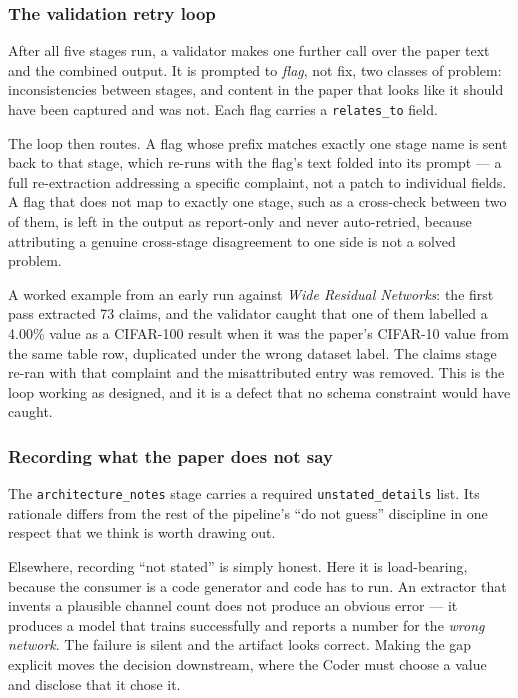 \documentclass[10pt,twocolumn]{article}
\begin{document}
\subsubsection{The validation retry loop}

After all five stages run, a validator makes one further call over the paper text and the
combined output. It is prompted to \emph{flag}, not fix, two classes of problem:
inconsistencies between stages, and content in the paper that looks like it should have
been captured and was not. Each flag carries a \texttt{relates\_to} field.

The loop then routes. A flag whose prefix matches exactly one stage name is sent back to
that stage, which re-runs with the flag's text folded into its prompt --- a full
re-extraction addressing a specific complaint, not a patch to individual fields. A flag
that does not map to exactly one stage, such as a cross-check between two of them, is
left in the output as report-only and never auto-retried, because attributing a genuine
cross-stage disagreement to one side is not a solved problem.

A worked example from an early run against \emph{Wide Residual Networks}: the first pass
extracted 73 claims, and the validator caught that one of them labelled a 4.00\% value as
a CIFAR-100 result when it was the paper's CIFAR-10 value from the same table row,
duplicated under the wrong dataset label. The claims stage re-ran with that complaint and
the misattributed entry was removed. This is the loop working as designed, and it is a
defect that no schema constraint would have caught.

\subsubsection{Recording what the paper does not say}

The \texttt{architecture\_notes} stage carries a required \texttt{unstated\_details} list.
Its rationale differs from the rest of the pipeline's ``do not guess'' discipline in one
respect that we think is worth drawing out.

Elsewhere, recording ``not stated'' is simply honest. Here it is load-bearing, because the
consumer is a code generator and code has to run. An extractor that invents a plausible
channel count does not produce an obvious error --- it produces a model that trains
successfully and reports a number for the \emph{wrong network}. The failure is silent and
the artifact looks correct. Making the gap explicit moves the decision downstream, where
the Coder must choose a value and disclose that it chose it.
\end{document}
